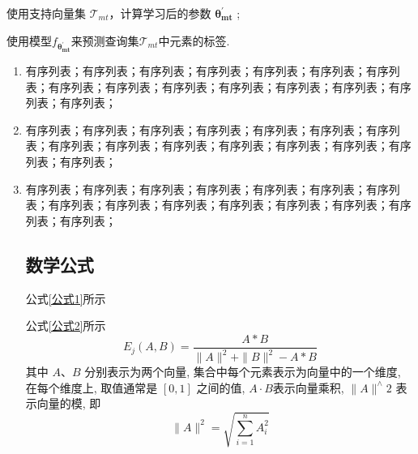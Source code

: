 \documentclass{template} %
\begin{document}
\begin{multicols}{2}
\begin{algorithm}[H]
	
	
	使用支持向量集 $\mathcal{T}_{mt}$，计算学习后的参数 $\bm{{\theta}^{\prime}_{mt}}$ ; 
	
	使用模型$f_{\bm{{\theta}_{mt}^{\prime}}}$来预测查询集$\mathcal{T}_{mt}$中元素的标签.

\end{algorithm}
\vspace{0.5em}

    \begin{enumerate}
        \item 有序列表；有序列表；有序列表；有序列表；有序列表；有序列表；有序列表；有序列表；有序列表；有序列表；有序列表；有序列表；有序列表；有序列表；有序列表；
        \item 有序列表；有序列表；有序列表；有序列表；有序列表；有序列表；有序列表；有序列表；有序列表；有序列表；有序列表；有序列表；有序列表；有序列表；有序列表；
        \item 有序列表；有序列表；有序列表；有序列表；有序列表；有序列表；有序列表；有序列表；有序列表；有序列表；有序列表；有序列表；有序列表；有序列表；有序列表；

\subsection{数学公式}
公式\eqref{公式1}所示

公式\eqref{公式2}所示
\begin{equation}
\label{公式1}
    E_j(A, B)=\frac{A * B}{\|A\|^2+\|B\|^2-A * B}
\end{equation}
其中 $A、B$ 分别表示为两个向量, 集合中每个元素表示为向量中的一个维度, 在每个维度上, 取值通常是 $[0,1]$ 之间的值, $A\cdot B$表示向量乘积, $\|A\|^{\wedge} 2$ 表示向量的模, 即
\begin{equation}
\label{公式2}
    \|A\|^2=\sqrt{\sum_{i=1}^n A_i^2}
\end{equation}

    \end{enumerate}



\end{multicols}
\end{document}
